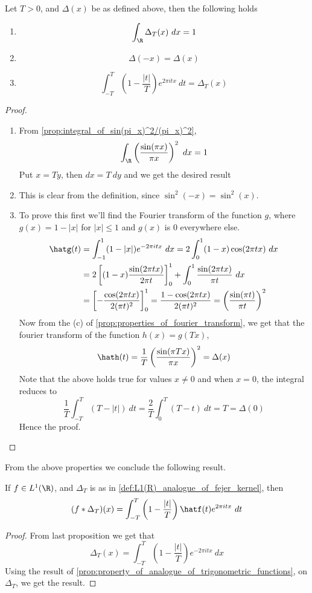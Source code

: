 \begin{proposition}
  \label{prop:properties_of_fejer_kernel_in_R}
  Let $T>0$, and $\Delta(x)$ be as defined above, then the following holds 
  \begin{enumerate}[label=(\alph*)]
    \item $$\int_\R \Delta_T(x) \ dx = 1$$
    \item $$\Delta(-x) = \Delta(x)$$
    \item $$\int_{-T}^T \left(1-\frac{|t|}{T}\right) e^{2\pi itx} \ dt = \Delta_T(x)$$
  \end{enumerate}
\end{proposition}
\begin{proof}
  \begin{enumerate}[label=(\alph*)]
    \item  
      From \autoref{prop:integral_of_sin(pi_x)^2/(pi_x)^2}, $$\int_\R \left(\frac{\sin(\pi x)}{\pi x}\right)^2 \ dx = 1$$
      Put $x=Ty$, then $dx = T \ dy $ and we get the desired result

    \item This is clear from the definition, since $\sin^2(-x) = \sin^2(x)$.
    \item To prove this first we'll find the Fourier transform of the function $g$, where $g(x) = 1 - |x|$ for $|x| \le 1$ and $g(x)$ is 0 everywhere else.
     \begin{align*}
       \hatg(t) &= \int_{-1}^1 (1-|x|)e^{-2 \pi itx} \ dx = 2\int_0^1(1-x)\cos(2\pi tx) \ dx \\
       &= 2\left[(1-x)\frac{\sin(2\pi tx)}{2\pi t} \right]_0^1 + \int_0^1\frac{\sin(2\pi tx)}{\pi t} \ dx \\
       &= \left[-\frac{\cos(2\pi tx)}{2(\pi t)^2}\right]_0^1 = \frac{1 - \cos(2\pi tx)}{2(\pi t)^2} = \left(\frac{\sin(\pi t)}{\pi t}\right)^2
     \end{align*}
      Now from the (c) of \autoref{prop:properties_of_fourier_transform}, we get that the fourier transform of the function $h(x) = g(Tx)$, $$\hath(t) = \frac{1}{T}\left(\frac{\sin(\pi Tx)}{\pi x}\right)^2 = \Delta(x)$$
      Note that the above holds true for values $x\neq 0$ and when $x=0$, the integral reduces to $$\frac{1}{T}\int_{-T}^T (T-|t|) \ dt =  \frac{2}{T}\int_0^T(T-t) \ dt = T = \Delta(0)$$
    Hence the proof.
  \end{enumerate}
\end{proof}

From the above properties we conclude the following result. 
\begin{corollary}
  \label{cor:convolution_with_fejer_kernel_in_L1(R)}
  If $f\in L^1(\R)$, and $\Delta_T$ is as in \autoref{def:L1(R)_analogue_of_fejer_kernel}, then $$(f*\Delta_T)(x) = \int_{-T}^T \left(1-\frac{|t|}{T}\right)\hatf(t)e^{2\pi itx} \ dt$$
\end{corollary}
\begin{proof}
  From last proposition we get that $$\Delta_T(x) = \int_{-T}^T \left(1-\frac{|t|}{T}\right)e^{-2 \pi itx} \ dx$$
  Using the result of \autoref{prop:property_of_analogue_of_trigonometric_functions}, on $\Delta_T$, we get the result.
\end{proof}

